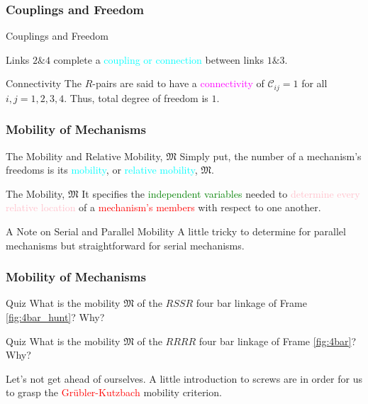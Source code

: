 \begin{frame}
	\frametitle{Couplings and Freedom}
	\begin{block}{Couplings and Freedom}
		
		Links $2 \& 4$ complete a \textcolor{cyan}{coupling or connection} between links $1 \& 3$. 
	\end{block}
	\begin{block}{Connectivity}
		The $R$-pairs are said to have a \textcolor{magenta}{connectivity} of  $\mathscr{C}_{ij}=1$ for all $i,j=1,2,3,4$. Thus, total degree of freedom is $1$.
	\end{block}
\end{frame}

\begin{frame}
	\frametitle{Mobility of Mechanisms}
	\begin{block}{The Mobility and Relative Mobility, $\mathfrak{M}$}
		Simply put, the number of a mechanism's freedoms is its \textcolor{cyan}{mobility}, or \textcolor{cyan}{relative mobility},  $\mathfrak{M}$.  
	\end{block}
	\begin{block}{The Mobility, $\mathfrak{M}$}
		It specifies the \textcolor{green}{independent variables} needed to \textcolor{pink}{determine every relative location} of a \textcolor{red}{mechanism's members}  with respect to one another.
	\end{block}
	\begin{block}{A Note on Serial and Parallel Mobility}
		A little tricky to determine for parallel mechanisms but straightforward for serial mechanisms.
	\end{block}
\end{frame}

\begin{frame}
	\frametitle{Mobility of Mechanisms}
	\begin{block}{Quiz}
		What is the mobility $\mathfrak{M}$ of the $RSSR$ four bar linkage of Frame \ref{fig:4bar_hunt}? Why?
	\end{block}
	\begin{block}{Quiz}
		What is the mobility $\mathfrak{M}$ of the $RRRR$ four bar linkage of Frame \ref{fig:4bar}? Why?
	\end{block}
	\begin{definition}
		Let's not get ahead of ourselves. A little introduction to screws are in order for us to grasp the \textcolor{red}{Gr{\"u}bler-Kutzbach} mobility criterion.
	\end{definition}
\end{frame}



